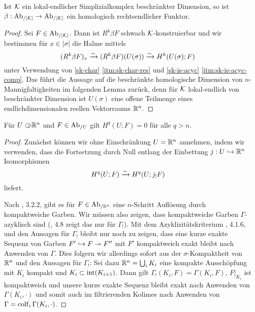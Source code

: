 \begin{lemma}
  Ist $\mathcal{K}$ ein lokal-endlicher Simplizialkomplex beschränkter
  Dimension, so ist $\beta: \operatorname{Ab}_{/|\mathcal{K}|} \to \operatorname{Ab}_{/|\mathcal{K}|}$ ein homologisch
  rechtsendlicher Funktor.

\end{lemma}


\begin{proof}
  Sei $F \in \operatorname{Ab}_{/|\mathcal{K}|}$. Dann ist $R^k \beta F$ schwach
  $\mathcal{K}$-konstruierbar und wir bestimmen für $x \in |\sigma|$ die
  Halme mittels
  \[ (R^k \beta F)_x \xrightarrow[]{\sim} (R^k \beta F)(U(\sigma)) \xrightarrow[]{\sim} H^k(U(\sigma); F) \]
  unter Verwendung von \ref{sk-char} \ref{itm:sk-char-res} und
  \ref{sk-is-acyc} \ref{itm:sk-is-acyc-comp}. Das führt die Aussage
  auf die beschränkte homologische Dimension von
  $n$-Mannigfaltigkeiten im folgenden Lemma zurück, denn für $\mathcal{K}$
  lokal-endlich von beschränkter Dimension ist $U(\sigma)$ eine offene
  Teilmenge eines endlichdimensionalen reellen Vektorraums $\mathbb{R}^n$.
\end{proof}
\begin{lemma}
  Für $U \subset\kern-0.58em\circ \mathbb{R}^n$ und $F \in \operatorname{Ab}_{/U}$ gilt $H^q(U; F) = 0$ für
  alle $q > n$.
\end{lemma}
\begin{proof}
  Zunächst können wir ohne Einschränkung $U = \mathbb{R}^n$ annehmen, indem
  wir verwenden, dass die Fortsetzung durch Null entlang der
  Einbettung $j: U \hookrightarrow \mathbb{R}^n$ Isomorphismen
  \[ H^q(U; F) \xrightarrow[]{\sim} H^q(U; j_! F) \]
  liefert.

  Nach \cite{KS}, 3.2.2, gibt es für $F \in \operatorname{Ab}_{/\mathbb{R}^n}$ eine
  $n$-Schritt Auflösung durch kompaktweiche Garben. Wir müssen also
  zeigen, dass kompaktweiche Garben $\Gamma$-azyklisch sind
  (\cite{TG}, 4.8 zeigt das nur für $\Gamma_!$). Mit dem
  Azyklizitätskriterium \cite{TG}, 4.1.6, und den Aussagen für
  $\Gamma_!$ bleibt nur noch zu zeigen, dass eine kurze exakte Sequenz
  von Garben $F' \hookrightarrow F \twoheadrightarrow F''$ mit $F'$ kompaktweich exakt bleibt
  nach Anwenden von $\Gamma$. Dies folgern wir allerdings sofort aus
  der $\sigma$-Kompaktheit von $\mathbb{R}^n$ und den Aussagen für $\Gamma_!$:
  Sei dazu $\mathbb{R}^n = \bigcup_i K_i$ eine kompakte Ausschöpfung mit $K_i$
  kompakt und $K_i \subset \operatorname{int}(K_{i+1})$. Dann gilt $\Gamma_!(K_i,
  F) = \Gamma(K_i, F)$, $F|_{K_i}$ ist kompaktweich und unsere kurze
  exakte Sequenz bleibt exakt nach Anwenden von $\Gamma(K_i, \cdot)$
  und somit auch im filtrierenden Kolimes nach Anwenden von $\Gamma =
  \operatorname{colf}_i \Gamma(K_i, \cdot)$.
\end{proof}
